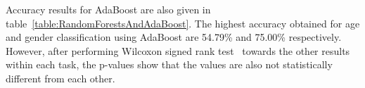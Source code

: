\documentclass[a4paper]{llncs}
\begin{document}
Accuracy results for AdaBoost are also given in table~\ref{table:RandomForestsAndAdaBoost}. The highest accuracy obtained for age and gender classification using AdaBoost are 54.79\% and 75.00\% respectively. However, after performing Wilcoxon signed rank test~\cite{wilcoxon1945individual} towards the other results within each task, the p-values show that the values are also not statistically different from each other. 

\end{document}
